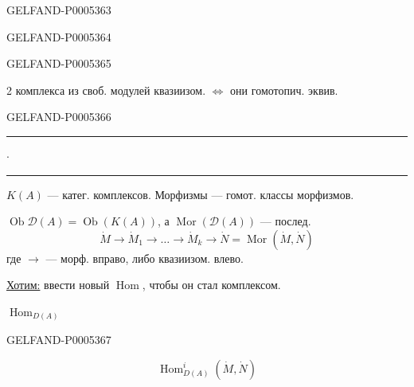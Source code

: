 \begin{GelfandAdjacentEvidence}{GELFAND-P000536}{3}


\end{GelfandAdjacentEvidence}
\begin{GelfandAdjacentEvidence}{GELFAND-P000536}{4}

\end{GelfandAdjacentEvidence}
\begin{GelfandAdjacentEvidence}{GELFAND-P000536}{5}


2 комплекса из своб. модулей квазиизом. \(\Longleftrightarrow\) они гомотопич. эквив.
\end{GelfandAdjacentEvidence}
\begin{GelfandAdjacentEvidence}{GELFAND-P000536}{6}


\hfill\rule{1.05cm}{.35pt}\enspace\(\cdot\)\enspace\rule{1.2cm}{.35pt}\par

$K(A)$ — катег. комплексов. Морфизмы — гомот. классы морфизмов.

\(\operatorname{Ob}\mathcal D(A)=\operatorname{Ob}(K(A))\), а
\(\operatorname{Mor}(\mathcal D(A))\) — послед.
\[
\dot M\to\dot M_1\to\ldots\to\dot M_k\to\dot N
=\operatorname{Mor}(\dot M,\dot N)
\]
где $\to$ — морф. вправо, либо квазиизом. влево.

\uline{Хотим:} ввести новый \(\operatorname{Hom}\), чтобы он стал комплексом.

\sout{\mbox{$\operatorname{Hom}_{D(A)}$}}
\end{GelfandAdjacentEvidence}
\begin{GelfandAdjacentEvidence}{GELFAND-P000536}{7}

\[
\operatorname{Hom}^i_{D(A)}(\dot M,\dot N)
\]
\end{GelfandAdjacentEvidence}

